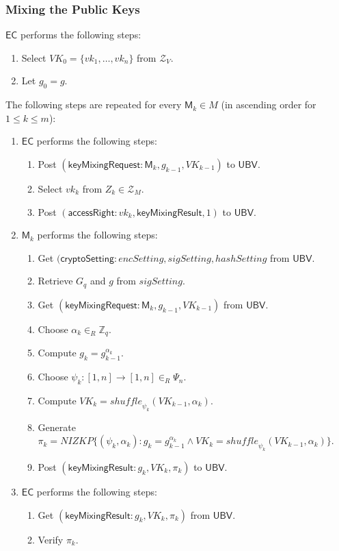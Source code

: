 \documentclass[bibtotoc,halfparskip,oneside]{scrreprt}
\newcommand{\vk}[1]{\mathit{vk}_{#1}\xspace}
\newcommand{\EC}{\ensuremath{\mathsf{EC}}\xspace}
\newcommand{\UBV}{\ensuremath{\mathsf{UBV}}\xspace}
\newcommand{\Mixer}[1]{\ensuremath{\mathsf{M}_{#1}}\xspace}
\begin{document}
\subsubsection{Mixing the Public Keys}
\EC performs the following steps:
\begin{enumerate}
	\item Select $\mathit{VK}_0=\{\vk{1},\ldots,\vk{n}\}$ from $\mathcal{Z}_V$.
	\item Let $g_0=g$.
\end{enumerate}
The following steps are repeated for every $\Mixer{k}\in M$ (in ascending order for $1\leq k\leq m$):
\begin{enumerate}[resume]
	\item \EC performs the following steps:
	\begin{enumerate}
		\item Post $(\mathsf{keyMixingRequest}:\Mixer{k},g_{k-1}, \mathit{VK}_{k-1})$ to \UBV.
		\item Select $\vk{k}$ from $Z_{k}\in \mathcal{Z}_{M}$.
		\item Post $(\mathsf{accessRight}:\vk{k},\mathsf{keyMixingResult},1)$ to \UBV.
	\end{enumerate}
	\item $\Mixer{k}$ performs the following steps:
	\begin{enumerate}
		\item Get $(\mathsf{cryptoSetting}:\mathit{encSetting},\mathit{sigSetting},\mathit{hashSetting}$ from \UBV.
		\item Retrieve $G_q$ and $g$ from $\mathit{sigSetting}$.
		\item Get $(\mathsf{keyMixingRequest}:\Mixer{k}, g_{k-1}, \mathit{VK}_{k-1})$ from \UBV.
		\item Choose $\alpha_k\in_R\mathbb{Z}_q$.
		\item Compute $g_k = g_{k-1}^{\alpha_k}$.
		\item Choose $\psi_k:[1,n]\rightarrow[1,n]\in_R\Psi_n$.
		\item Compute $\mathit{VK}_k=\mathit{shuffle}_{\psi_k}(\mathit{VK}_{k-1},\alpha_k)$.
		\item Generate $\pi_{k}=\mathit{NIZKP}\{(\psi_k,\alpha_k):g_k=g_{k-1}^{\alpha_k}\wedge \mathit{VK}_{k}=\mathit{shuffle}_{\psi_k}(\mathit{VK}_{k-1},\alpha_k)\}$.
		\item Post $(\mathsf{keyMixingResult}:g_k,\mathit{VK}_k,\pi_{k})$ to \UBV.
	\end{enumerate}
	\item \EC performs the following steps:
	\begin{enumerate}
		\item Get $(\mathsf{keyMixingResult}:g_k,\mathit{VK}_k,\pi_{k})$ from \UBV.
		\item Verify $\pi_{k}$.
	\end{enumerate}
\end{enumerate}
\end{document}
